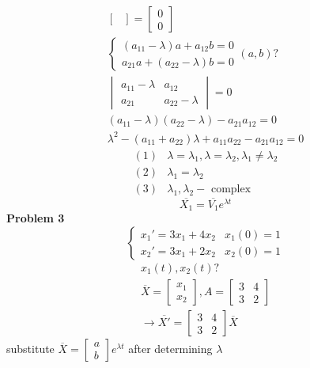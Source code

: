 \documentclass[10pt, letterpaper]{article}
\begin{document}
\begin{align*}
\begin{bmatrix}
\end{bmatrix} = \begin{bmatrix}
	0\\
	0
\end{bmatrix}\\
\begin{cases}
	(a_{11}-\lambda)a+a_{12}b=0\\
	a_{21}a+(a_{22}-\lambda)b=0
\end{cases} (a,b)?\\
\begin{vmatrix}
	a_{11}-\lambda & a_{12}\\
	a_{21} & a_{22}-\lambda
\end{vmatrix} = 0\\
(a_{11} - \lambda)(a_{22} - \lambda) - a_{21}a_{12} = 0\\
\lambda^2 - (a_{11}+a_{22})\lambda + a_{11}a_{22} - a_{21}a_{12} = 0
\end{align*}
\begin{align*}
	(1) & \lambda=\lambda_1, \lambda=\lambda_2, \lambda_1 \neq \lambda_2\\
	(2) & \lambda_1 = \lambda_2\\
	(3) & \lambda_1, \lambda_2 - \text{ complex}
\end{align*}
\begin{equation*}
\overline{X_1} = \overline{V_1} e^{\lambda t}
\end{equation*}
\textbf{Problem 3}
\begin{equation*}
\begin{cases}
	x_1'=3x_1+4x_2 & x_1(0)=1\\
	x_2'=3x_1+2x_2 & x_2(0)=1
\end{cases}
\end{equation*}
\begin{align*}
x_1(t), x_2(t) ?\\
\overline{X} = \begin{bmatrix}
	x_1\\
	x_2
\end{bmatrix}, A = \begin{bmatrix}
	3 & 4\\
	3 & 2
\end{bmatrix}\\
\rightarrow \overline{X'} = \begin{bmatrix}
	3 & 4\\
	3 & 2
\end{bmatrix} \overline{X}
\end{align*}
substitute $\overline{X} = \begin{bmatrix}
	a\\
	b
\end{bmatrix} e^{\lambda t}$ after determining $\lambda$
\end{document}
